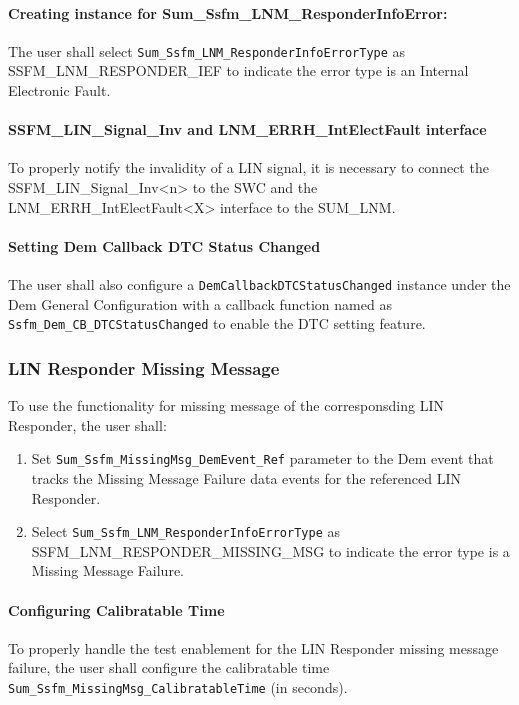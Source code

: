 \paragraph{Creating instance for Sum\_Ssfm\_LNM\_ResponderInfoError:}
The user shall select \texttt{Sum\_Ssfm\_LNM\_ResponderInfoErrorType} as SSFM\_LNM\_RESPONDER\_IEF to indicate the error type is an Internal Electronic Fault.

\paragraph{SSFM\_LIN\_Signal\_Inv and LNM\_ERRH\_IntElectFault interface}
To properly notify the invalidity of a LIN signal, it is necessary to connect the SSFM\_LIN\_Signal\_Inv<n> to the SWC and the LNM\_ERRH\_IntElectFault<X> interface to the SUM\_LNM.

\paragraph{Setting Dem Callback DTC Status Changed}
The user shall also configure a \texttt{DemCallbackDTCStatusChanged} instance under the Dem General Configuration 
with a callback function named as \texttt{Ssfm\_Dem\_CB\_DTCStatusChanged} to enable the DTC setting feature.

\subsubsection{LIN Responder Missing Message}
\label{subsubsec:LINRespMissingMsg}

To use the functionality for missing message of the corresponsding LIN Responder, the user shall:
\begin{enumerate}
	\item Set \texttt{Sum\_Ssfm\_MissingMsg\_DemEvent\_Ref} parameter to the Dem event that tracks the Missing Message Failure data events for the referenced LIN Responder.
	\item Select \texttt{Sum\_Ssfm\_LNM\_ResponderInfoErrorType} as SSFM\_LNM\_RESPONDER\_MISSING\_MSG to indicate the error type is a Missing Message Failure.
\end{enumerate}

\paragraph{Configuring Calibratable Time}
To properly handle the test enablement for the LIN Responder missing message failure, the user shall configure the calibratable time \texttt{Sum\_Ssfm\_MissingMsg\_CalibratableTime} (in seconds).

